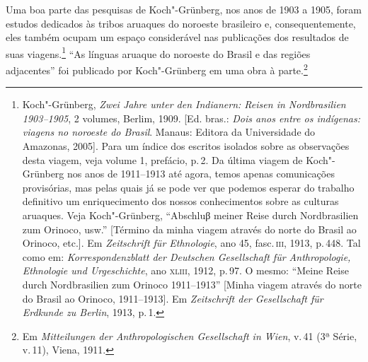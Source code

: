 Uma boa parte das pesquisas de Koch"-Grünberg, nos anos de 1903 a 1905,
foram estudos dedicados às tribos aruaques do noroeste brasileiro e,
consequentemente, eles também ocupam um espaço considerável nas
publicações dos resultados de suas viagens.\footnote{Koch"-Grünberg,
\textit{Zwei Jahre unter den Indianern: Reisen in Nordbrasilien
  1903--1905}, 2 volumes, Berlim, 1909. {[}Ed. bras.: \textit{Dois anos entre os indígenas: viagens no noroeste do Brasil}. Manaus:
  Editora da Universidade do Amazonas, 2005{]}. Para um índice dos
  escritos isolados sobre as observações desta viagem, veja volume 1,
  prefácio, p.\,2. Da última viagem de Koch"-Grünberg nos anos de
  1911--1913 até agora, temos apenas comunicações provisórias, mas pelas
  quais já se pode ver que podemos esperar do trabalho definitivo um
  enriquecimento dos nossos conhecimentos sobre as culturas aruaques. Veja
  Koch"-Grünberg, ``Abschluβ meiner Reise durch Nordbrasilien zum
  Orinoco, usw.'' {[}Término da minha viagem através do norte do Brasil
  ao Orinoco, etc.{]}. Em \textit{Zeitschrift für Ethnologie}, ano 45,
  fasc.\,\textsc{iii}, 1913, p.\,448. Tal como em: \textit{Korrespondenzblatt
  der Deutschen Gesellschaft für Anthropologie, Ethnologie und
  Urgeschichte}, ano \textsc{xliii}, 1912, p.\,97. O mesmo: ``Meine Reise durch
  Nordbrasilien zum Orinoco 1911--1913'' {[}Minha viagem através do norte
  do Brasil ao Orinoco, 1911--1913{]}. Em \textit{Zeitschrift der
  Gesellschaft für Erdkunde zu Berlin}, 1913, p.\,1.} ``As
línguas aruaque do noroeste do Brasil e das regiões adjacentes'' foi
publicado por Koch"-Grünberg em uma obra à parte.\footnote{Em
  \textit{Mitteilungen der Anthropologischen Gesellschaft in Wien}, v.\,41
  (3ª Série, v.\,11), Viena, 1911.} %

